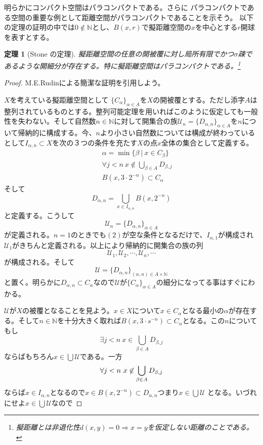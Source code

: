 \documentclass[leqno]{jsarticle}
\newtheorem{thm}{定理}
\newcommand{\To}{\Longrightarrow}
\newcommand{\nn}{\mathbb{N}}
\newcommand{\al}{\alpha}
\newcommand{\be}{\beta}
\begin{document}
\setcounter{equation}{0}明らかにコンパクト空間はパラコンパクトである。さらに
パラコンパクトである空間の重要な例として距離空間がパラコンパクトであることを示そう。
以下の定理の証明の中では$0\not\in \nn$とし、$B(x,r)$で擬距離空間の$x$を中心とする$r$開球を表すとする。
\begin{thm}[Stone の定理]
擬距離空間の任意の開被覆に対し局所有限でかつ$\sigma$疎であるような開細分が存在する。特に擬距離空間はパラコンパクトである。\footnote{擬距離とは非退化性$d(x,y)=0\To x=y$を仮定しない距離のことである。}
\end{thm}
\begin{proof}M.E.Rudinによる簡潔な証明\cite{5}を引用しよう。\par 
$X$を考えている擬距離空間として
$\{C_{\al}\}_{\al\in A}$を$X$の開被覆とする。ただし添字$A$は整列されているものとする。整列可能定理を用いればこのように仮定しても一般性を失わない。そして自然数$n\in \nn$に対して開集合の族$\mathcal{U}_n=\{D_{\al,n}\}_{\al\in A}$を$n$について帰納的に構成する。今、$n$より小さい自然数については構成が終わっているとして$I_{\al,n}\subset X$を次の３つの条件を充たす$X$の点$x$全体の集合として定義する。
\begin{eqnarray}
&&\al =\min \{\be \ |\ x\in C_\be \}\\
&&\forall j<n\ x\not\in \bigcup_{\be \in A}D_{\be,j}\\ 
&&B(x,3\cdot2^{-n})\subset C_{\al}
\end{eqnarray}
そして
\[
D_{\al,n}=\bigcup_{x\in I_{\al,n}}B(x,2^{-n})
\]
と定義する。こうして
\[
\mathcal{U}_n=\{D_{\al,n}\}_{\al\in A}
\]
が定義される。$n=1$のときでも$(2)$が空な条件となるだけで、$I_{\al,1}$が構成され$\mathcal{U}_1$がきちんと定義される。以上により帰納的に開集合の族の列
\[
\mathcal{U}_1,\mathcal{U}_2,\cdots ,\mathcal{U}_n,\cdots
\]
が構成される。そして
\[
\mathcal{U}=\{D_{\al,n}\}_{(\al,n)\in A\times \nn}
\]
と置く。明らかに$D_{\al,n}\subset C_{\al}$なので$\mathcal{U}$が$\{C_{\al}\}_{\al\in A}$の細分になってる事はすぐにわかる。\par 
$\mathcal{U}$が$X$の被覆となることを見よう。$x\in X$について$x\in C_{\al}$となる最小の$\al$が存在する。そして$n\in\nn$を十分大きく取れば$B(x,3\cdot s^{-n})\subset C_{\al}$となる。この$n$についてもし
\[
\exists j<n\ x\in \bigcup_{\be \in A}D_{\be,j}
\]
ならばもちろん$x\in \bigcup \mathcal{U}$である。一方
\[
\forall j<n\ x\not\in \bigcup_{\be \in A}D_{\be,j}\\ 
\]
ならば$x\in I_{\al,n}$となるので$x\in B(x,2^{-n})\subset D_{\al,n}$つまり$x\in \bigcup\mathcal{U}$
となる。いづれにせよ$x\in \bigcup\mathcal{U}$なので

\end{proof}
\end{document}
